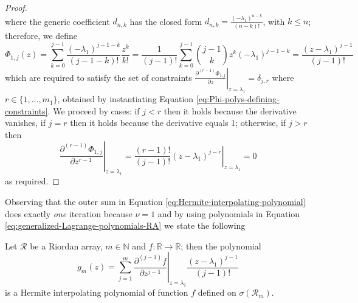 \begin{proof}
\begin{equation}
\end{equation}
where the generic coefficient $d_{n,k}$ has the closed form $d_{n,k} =
\frac{\left(-\lambda_{1}\right)^{n-k}}{\left(n-k\right)!}$, with $k\leq n$;
therefore, we define
\begin{displaymath}
  \Phi_{1,j}(z) = \sum_{k=0}^{j-1}{\frac{(-\lambda_{1})^{j-1-k}}{(j-1-k)!}\frac{z^{k}}{k!}}
                = \frac{1}{(j-1)!}\sum_{k=0}^{j-1}{{ {j-1}\choose{k} }{z^{k}}{(-\lambda_{1})^{j-1-k}}}
                = \frac{\left(z-\lambda_{1}\right)^{j-1}}{(j-1)!}
\end{displaymath}
which are required to satisfy the set of constraints $ \left.
\frac{\partial^{(r-1)}{\Phi_{1,j}}}{\partial{z}} \right|_{z=\lambda_{1}} =
\delta_{j,r}$ where $r \in \lbrace 1, \ldots, m_{1} \rbrace $, obtained by
instantiating Equation \ref{eq:Phi-polys-defining-constraints}.
We proceed by cases: if $j<r$ then it holds because the derivative vanishes, if
$j=r$ then it holds because the derivative equals $1$; otherwise, if $j>r$
then
\begin{displaymath}
    \left. \frac{\partial^{(r-1)}{\Phi_{1,j}}}{\partial{z}^{r-1}}
    \right|_{z=\lambda_{1}} = 
    \left. \frac{(r-1)!}{(j-1)!}(z-\lambda_{1})^{j-r}
    \right|_{z=\lambda_{1}} = 0
\end{displaymath}
as required.
\qedhere
\end{proof}

Observing that the outer sum in Equation
\ref{eq:Hermite-interpolating-polynomial} does exactly \textit{one} iteration
because $\nu=1$ and by using polynomials in
Equation \ref{eq:generalized-Lagrange-polynomials-RA} %
we state the following
\begin{theorem}
\label{thm:Hermite-interpolating-polynomial-Riordan}
Let $\mathcal{R}$ be a Riordan array, $m\in\mathbb{N}$ and $f:
\mathbb{R}\rightarrow\mathbb{R}$; then the polynomial
\begin{equation}
\label{eq:Hermite-interpolating-polynomial-RA}
g_{m}(z) = {\sum_{j=1}^{m}{ \left.
\frac{\partial^{(j-1)}{f}}{\partial{z}^{j-1}} \right|_{z=\lambda_{1}}}}
\frac{\left(z-\lambda_{1}\right)^{j-1}}{(j-1)!}
\end{equation}
is a Hermite interpolating polynomial of function $f$ defined on
$\sigma\left(\mathcal{R}_{m}\right)$.
\end{theorem}



